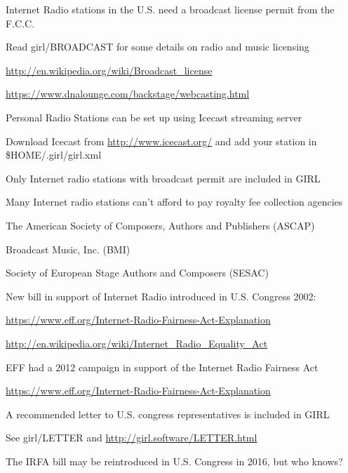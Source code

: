 \documentclass[20pt,landscape]{foils}
\begin{document}
\begin{list1}
  \item Internet Radio stations in the U.S. need a broadcast license permit from the F.C.C.
    \begin{list2}
    \item Read girl/BROADCAST for some details on radio and music licensing
    \item \url{http://en.wikipedia.org/wiki/Broadcast_license}
    \item \url{https://www.dnalounge.com/backstage/webcasting.html}
    \end{list2}
  \item Personal Radio Stations can be set up using Icecast streaming server
    \begin{list2}
    \item Download Icecast from \url{http://www.icecast.org/} and add your station in \$HOME/.girl/girl.xml
    \end{list2}
  \item Only Internet radio stations with broadcast permit are included in GIRL
\end{list1}


\begin{list1}
\item Many Internet radio stations can't afford to pay royalty fee collection agencies
  \begin{list2}
  \item The American Society of Composers, Authors and Publishers (ASCAP)
  \item Broadcast Music, Inc. (BMI)
    \item Society of European Stage Authors and Composers (SESAC)
  \end{list2}
  \item New bill in support of Internet Radio introduced in U.S. Congress 2002:
  \begin{list2}
  \item \url{https://www.eff.org/Internet-Radio-Fairness-Act-Explanation}
  \item \url{http://en.wikipedia.org/wiki/Internet_Radio_Equality_Act}
  \end{list2}
\item EFF had a 2012 campaign in support of the Internet Radio Fairness Act
  \begin{list2}
  \item \url{https://www.eff.org/Internet-Radio-Fairness-Act-Explanation}
  \end{list2}
\item A recommended letter to U.S. congress representatives is included in GIRL
  \begin{list2}
  \item See girl/LETTER and \url{http://girl.software/LETTER.html}
  \end{list2}
\item The IRFA bill may be reintroduced in U.S. Congress in 2016, but who knows?
\end{list1}
\end{document}
